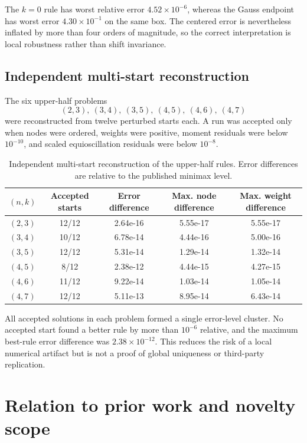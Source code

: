 \documentclass[preprint,12pt]{elsarticle}
\theoremstyle{remark}
\begin{document}
The \(k=0\) rule has worst relative error
\(4.52\times10^{-6}\), whereas the Gauss endpoint has worst error
\(4.30\times10^{-1}\) on the same box. The centered error is nevertheless
inflated by more than four orders of magnitude, so the correct
interpretation is local robustness rather than shift invariance.

\subsection{Independent multi-start reconstruction}

The six upper-half problems
\[
(2,3),\ (3,4),\ (3,5),\ (4,5),\ (4,6),\ (4,7)
\]
were reconstructed from twelve perturbed starts each. A run was accepted
only when nodes were ordered, weights were positive, moment residuals
were below \(10^{-10}\), and scaled equioscillation residuals were below
\(10^{-8}\).

\begin{table}[ht]
\centering
\caption{Independent multi-start reconstruction of the upper-half
rules. Error differences are relative to the published minimax level.}
\label{tab:multistart}
\scriptsize
\begin{tabular}{ccccc}
\toprule
\((n,k)\) & Accepted starts & Error difference &
Max. node difference & Max. weight difference\\
\midrule
$(2,3)$ & 12/12 & 2.64e-16 & 5.55e-17 & 5.55e-17 \\
$(3,4)$ & 10/12 & 6.78e-14 & 4.44e-16 & 5.00e-16 \\
$(3,5)$ & 12/12 & 5.31e-14 & 1.29e-14 & 1.32e-14 \\
$(4,5)$ & 8/12 & 2.38e-12 & 4.44e-15 & 4.27e-15 \\
$(4,6)$ & 11/12 & 9.22e-14 & 1.03e-14 & 1.05e-14 \\
$(4,7)$ & 12/12 & 5.11e-13 & 8.95e-14 & 6.43e-14 \\
\bottomrule
\end{tabular}
\end{table}

All accepted solutions in each problem formed a single error-level
cluster. No accepted start found a better rule by more than
\(10^{-6}\) relative, and the maximum best-rule error difference was
\(2.38\times10^{-12}\). This reduces the risk of a local numerical
artifact but is not a proof of global uniqueness or third-party
replication.

\section{Relation to prior work and novelty scope}
\end{document}
